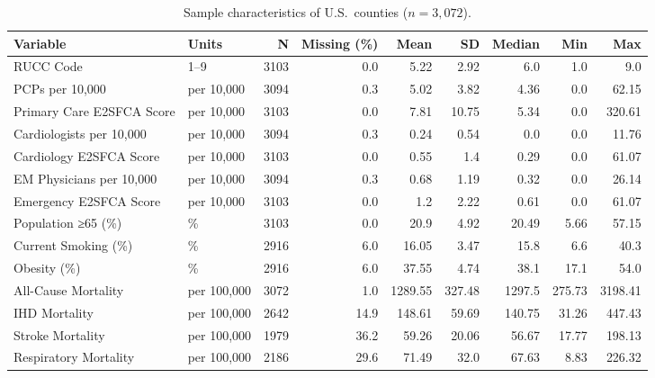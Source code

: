 \begin{table}[ht]
\centering
\small
\caption{Sample characteristics of U.S.\ counties ($n = 3{,}072$).}
\label{tab:summary_stats}
\begin{tabular}{llrrrrrrr}
\toprule
Variable & Units & N & Missing (\%) & Mean & SD & Median & Min & Max \\
\midrule
RUCC Code & 1–9 & 3103 & 0.0 & 5.22 & 2.92 & 6.0 & 1.0 & 9.0 \\
PCPs per 10,000 & per 10,000 & 3094 & 0.3 & 5.02 & 3.82 & 4.36 & 0.0 & 62.15 \\
Primary Care E2SFCA Score & per 10,000 & 3103 & 0.0 & 7.81 & 10.75 & 5.34 & 0.0 & 320.61 \\
Cardiologists per 10,000 & per 10,000 & 3094 & 0.3 & 0.24 & 0.54 & 0.0 & 0.0 & 11.76 \\
Cardiology E2SFCA Score & per 10,000 & 3103 & 0.0 & 0.55 & 1.4 & 0.29 & 0.0 & 61.07 \\
EM Physicians per 10,000 & per 10,000 & 3094 & 0.3 & 0.68 & 1.19 & 0.32 & 0.0 & 26.14 \\
Emergency E2SFCA Score & per 10,000 & 3103 & 0.0 & 1.2 & 2.22 & 0.61 & 0.0 & 61.07 \\
Population ≥65 (\%) & \% & 3103 & 0.0 & 20.9 & 4.92 & 20.49 & 5.66 & 57.15 \\
Current Smoking (\%) & \% & 2916 & 6.0 & 16.05 & 3.47 & 15.8 & 6.6 & 40.3 \\
Obesity (\%) & \% & 2916 & 6.0 & 37.55 & 4.74 & 38.1 & 17.1 & 54.0 \\
All-Cause Mortality & per 100,000 & 3072 & 1.0 & 1289.55 & 327.48 & 1297.5 & 275.73 & 3198.41 \\
IHD Mortality & per 100,000 & 2642 & 14.9 & 148.61 & 59.69 & 140.75 & 31.26 & 447.43 \\
Stroke Mortality & per 100,000 & 1979 & 36.2 & 59.26 & 20.06 & 56.67 & 17.77 & 198.13 \\
Respiratory Mortality & per 100,000 & 2186 & 29.6 & 71.49 & 32.0 & 67.63 & 8.83 & 226.32 \\
\bottomrule
\end{tabular}
\end{table}
